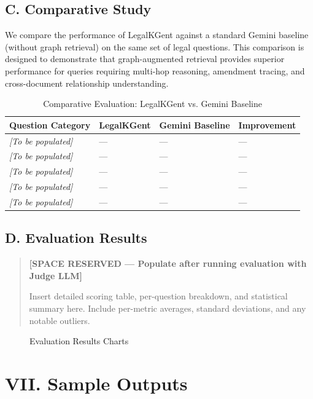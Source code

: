 \documentclass[10pt, a4paper, twocolumn]{article}
\begin{document}
\subsection{C. Comparative Study}
We compare the performance of LegalKGent against a standard Gemini baseline (without graph retrieval) on the same set of legal questions. This comparison is designed to demonstrate that graph-augmented retrieval provides superior performance for queries requiring multi-hop reasoning, amendment tracing, and cross-document relationship understanding.

\begin{table}[t]
\centering
\small
\begin{tabularx}{\textwidth}{|>{\hsize=0.4\hsize}X|>{\hsize=0.2\hsize}X|>{\hsize=0.2\hsize}X|>{\hsize=0.2\hsize}X|}
\hline
\textbf{Question Category} & \textbf{LegalKGent} & \textbf{Gemini Baseline} & \textbf{Improvement} \\
\hline
\textit{[To be populated]} & — & — & — \\
\hline
\textit{[To be populated]} & — & — & — \\
\hline
\textit{[To be populated]} & — & — & — \\
\hline
\textit{[To be populated]} & — & — & — \\
\hline
\textit{[To be populated]} & — & — & — \\
\hline
\end{tabularx}
\caption{Comparative Evaluation: LegalKGent vs. Gemini Baseline}
\end{table}

\subsection{D. Evaluation Results}

\begin{quote}
\textbf{[SPACE RESERVED — Populate after running evaluation with Judge LLM]}

Insert detailed scoring table, per-question breakdown, and statistical summary here.
Include per-metric averages, standard deviations, and any notable outliers.
\end{quote}

\begin{figure}[t]
\centering
\vspace{6cm} %
\caption{Evaluation Results Charts}
\end{figure}

\section{VII. Sample Outputs}
\end{document}
